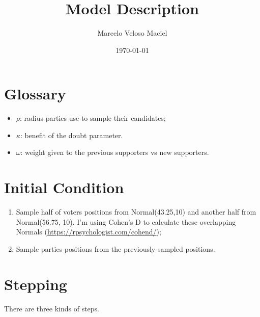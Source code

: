 \documentclass[11pt]{article}
\author{Marcelo Veloso Maciel}
\date{\today}
\title{Model Description}
\begin{document}
\maketitle
\tableofcontents

\section{Glossary}
\begin{itemize}
  \item \(\rho\): radius parties use to sample their candidates;
  \item \(\kappa\): benefit of the doubt parameter.
  \item \(\omega\): weight given to the previous supporters vs new supporters.
\end{itemize}


\section{Initial Condition}
\label{sec:orga7f82a7}
\begin{enumerate}
  \item Sample half of voters positions from Normal(43.25,10) and another half
        from Normal(56.75, 10). I'm using Cohen's D to calculate these overlapping Normals (\url{https://rpsychologist.com/cohend/});
\item Sample parties positions from the previously sampled positions.
\end{enumerate}

\section{Stepping}
There are three kinds of steps.
\end{document}
